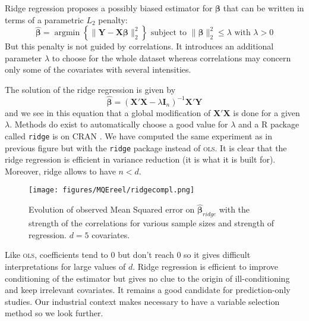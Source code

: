 \documentclass[12pt,a4paper]{report}
\begin{document}
Ridge regression \cite{hoerl1970ridge,marquardt1975ridge} proposes a possibly biased estimator for $\boldsymbol{\beta}$ that can be written in terms of a parametric $L_2$ penalty:
	\begin{equation}
		 \boldsymbol{\hat{\beta}}=\operatorname{argmin} \left\lbrace \parallel \boldsymbol{Y}-\boldsymbol{X\beta}\parallel_2^2 \right\rbrace \textrm{ subject to } \parallel \boldsymbol{\beta} \parallel_2^2\leq \lambda \textrm{ with } \lambda>0
	\end{equation}
	But this penalty is not guided by correlations. It introduces an additional parameter $\lambda$ to choose for the whole dataset  whereas correlations may concern only some of the covariates with several intensities.
	
	The solution of the ridge regression is given by
	\begin{equation}
		 \hat{\boldsymbol{\beta}}=\left(\boldsymbol{X}'\boldsymbol{X} -\lambda\boldsymbol{I}_n\right) ^{-1}\boldsymbol{X}'\boldsymbol{Y}\label{betaridge}
	\end{equation}
	and we see in this equation that a global modification of $\boldsymbol{X}'\boldsymbol{X}$ is done for a given $\lambda$. Methods do exist to automatically choose a good value for $\lambda$ \cite{cule2013ridge,er2013systematic} and a R package called {\tt ridge} is on CRAN \cite{packageridge}. 
	We have computed the same experiment as in previous figure but with the {\tt ridge} package instead of \textsc{ols}. It is clear that the ridge regression is efficient in variance reduction (it is what it is built for). Moreover, ridge allows to have $n<d$.\\
	
	 \begin{figure}
	 \centering
	  \texttt{[image: figures/MQEreel/ridgecompl.png]}
	  \caption{Evolution of observed Mean Squared error on $\hat{\boldsymbol{\beta}}_{ridge}$ with the strength of the correlations for various sample sizes and strength of regression. $d=5$ covariates. } \label{MQEridgecompl}
	\end{figure}
	
	
	Like \textsc{ols}, coefficients tend to 0 but don't reach 0 so it gives difficult interpretations for large values of $d$. Ridge regression is efficient to improve conditioning of the estimator but gives no clue to the origin of ill-conditioning and keep irrelevant covariates. It remains a good candidate for prediction-only studies. Our industrial context makes necessary to have a variable selection method so we look further.
	
\end{document}
